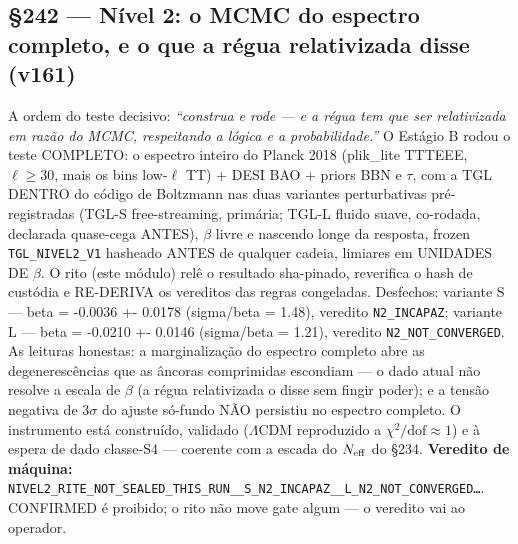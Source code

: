\documentclass[11pt]{article}
\theoremstyle{definition}\newtheorem{deriv}{Derivação}
\begin{document}
\subsection*{\S242 --- Nível 2: o MCMC do espectro completo, e o que a régua relativizada disse (v161)}A ordem do teste decisivo: \emph{``construa e rode --- e a régua tem que ser relativizada em razão do MCMC, respeitando a lógica e a probabilidade.''} O Estágio B rodou o teste COMPLETO: o espectro inteiro do Planck 2018 (plik\_lite TTTEEE, $\ell{\geq}30$, mais os bins low-$\ell$ TT) + DESI BAO + priors BBN e $\tau$, com a TGL DENTRO do código de Boltzmann nas duas variantes perturbativas pré-registradas (TGL-S free-streaming, primária; TGL-L fluido suave, co-rodada, declarada quase-cega ANTES), $\beta$ livre e nascendo longe da resposta, frozen \texttt{TGL\_NIVEL2\_V1} hasheado ANTES de qualquer cadeia, limiares em UNIDADES DE $\beta$. O rito (este módulo) relê o resultado sha-pinado, reverifica o hash de custódia e RE-DERIVA os vereditos das regras congeladas. Desfechos: variante S --- beta = -0.0036 +- 0.0178 (sigma/beta = 1.48), veredito \texttt{N2\_INCAPAZ}; variante L --- beta = -0.0210 +- 0.0146 (sigma/beta = 1.21), veredito \texttt{N2\_NOT\_CONVERGED}. As leituras honestas: a marginalização do espectro completo abre as degenerescências que as âncoras comprimidas escondiam --- o dado atual não resolve a escala de $\beta$ (a régua relativizada o disse sem fingir poder); e a tensão negativa de $3\sigma$ do ajuste só-fundo NÃO persistiu no espectro completo. O instrumento está construído, validado ($\Lambda$CDM reproduzido a $\chi^2/\mathrm{dof}{\approx}1$) e à espera de dado classe-S4 --- coerente com a escada do $N_{\rm eff}$ do \S234. \textbf{Veredito de máquina:} \texttt{NIVEL2\_RITE\_NOT\_SEALED\_THIS\_RUN\_\_S\_N2\_INCAPAZ\_\_L\_N2\_NOT\_CONVERGED\ldots}. CONFIRMED é proibido; o rito não move gate algum --- o veredito vai ao operador.
\end{document}
